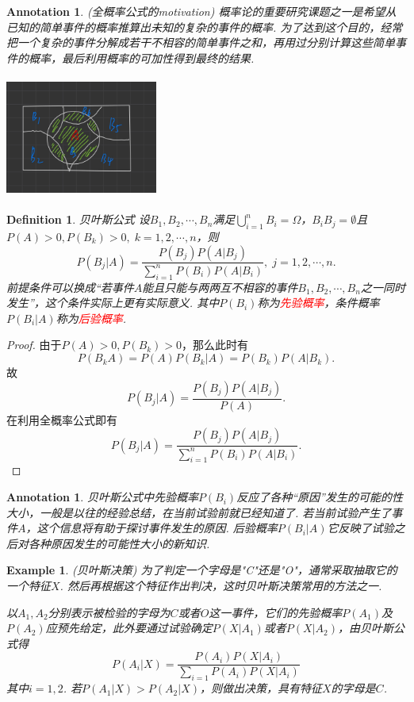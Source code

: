 \documentclass{article}
\newtheorem{example}[theorem]{Example}
\newtheorem{definition}[theorem]{Definition}
\newtheorem{annotation}[theorem]{Annotation}
\newcommand{\redt}[1]{\textcolor{red}{#1}}
\begin{document}
\begin{annotation}
\rm {\color{red}(全概率公式的motivation)} 概率论的重要研究课题之一是希望从已知的简单事件的概率推算出未知的复杂的事件的概率. 为了达到这个目的，经常把一个复杂的事件分解成若干不相容的简单事件之和，再用过分别计算这些简单事件的概率，最后利用概率的可加性得到最终的结果.

\begin{center}
\includegraphics[width=5cm, height=4cm]{images/total_probability.jpg}
\end{center}
\end{annotation}

\begin{definition}
\rm {\color{red}贝叶斯公式} 设$B_1,B_2,\cdots,B_n$满足$\bigcup\limits_{i=1}^n B_i = \Omega$，$B_iB_j = \emptyset$且$P(A)>0, P(B_k) > 0,\; k=1,2,\cdots,n$，则
	$$
		P(B_j | A) = \frac{P(B_j)P(A|B_j)}{\sum\limits_{i=1}^n P(B_i)P(A|B_i)},\; j = 1,2,\cdots,n.
	$$
前提条件可以换成“若事件$A$能且只能与两两互不相容的事件$B_1,B_2,\cdots,B_n$之一同时发生”，这个条件实际上更有实际意义. 其中$P(B_i)$称为\redt{先验概率}，条件概率$P(B_i | A)$称为\redt{后验概率}. 
\end{definition}

\begin{proof}
由于$P(A) > 0,P(B_k) > 0$，那么此时有
$$
P(B_kA) = P(A)P(B_k|A) = P(B_k)P(A|B_k). 
$$
故
$$
P(B_j|A) = \frac{P(B_j)P(A|B_j)}{P(A)}.
$$
在利用全概率公式即有
$$
P(B_j|A) = \frac{P(B_j)P(A|B_j)}{\sum\limits_{i =1}^n P(B_i)P(A|B_i)}.
$$
\end{proof}

\begin{annotation}
\rm 贝叶斯公式中先验概率$P(B_i)$反应了各种“原因”发生的可能的性大小，一般是以往的经验总结，在当前试验前就已经知道了. 若当前试验产生了事件$A$，这个信息将有助于探讨事件发生的原因. 后验概率$P(B_i|A)$它反映了试验之后对各种原因发生的可能性大小的新知识.
\end{annotation}

\begin{example}
\rm {\color{red}(贝叶斯决策)} 为了判定一个字母是"C"还是"O"，通常采取抽取它的一个特征$X$. 然后再根据这个特征作出判决，这时贝叶斯决策常用的方法之一. 

以$A_1,A_2$分别表示被检验的字母为$C$或者$O$这一事件，它们的先验概率$P(A_1)$及$P(A_2)$应预先给定，此外要通过试验确定$P(X|A_1)$或者$P(X|A_2)$，由贝叶斯公式得
$$
P(A_i|X) = \frac{P(A_i)P(X|A_i)}{\sum\limits_{i=1}P(A_i)P(X|A_i)} 
$$
其中$i=1,2$. 若$P(A_1 | X) > P(A_2 | X)$，则做出决策，具有特征$X$的字母是$C$.
\end{example}
\end{document}
